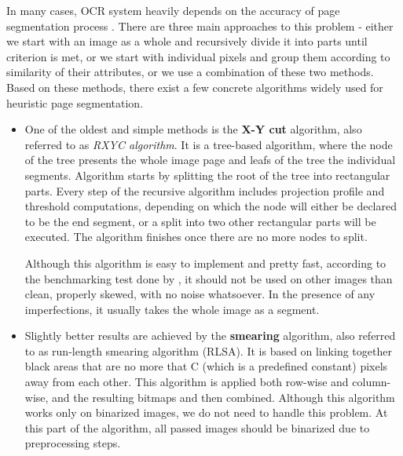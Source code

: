 In many cases, OCR system heavily depends on the accuracy of page segmentation process \citep{pageSegmentation}. There are three main approaches \citep{segmentationBenchmark} to this problem - either we start with an image as a whole and recursively divide it into parts until criterion is met, or we start with individual pixels and group them according to similarity of their attributes, or we use a combination of these two methods. Based on these methods, there exist a few concrete algorithms widely used for heuristic page segmentation.


\begin{itemize}

\item One of the oldest and simple methods is the \textbf{X-Y cut } algorithm, also referred to as \emph{RXYC algorithm}. It is a tree-based algorithm, where the node of the tree presents the whole image page and leafs of the tree the individual segments. Algorithm starts by splitting the root of the tree into rectangular parts. Every step of the recursive algorithm includes projection profile and threshold computations, depending on which the node will either be declared to be the end segment, or a split into two other rectangular parts will be executed. The algorithm finishes once there are no more nodes to split.

Although this algorithm is easy to implement and pretty fast, according to the benchmarking test done by \citet{segmentationBenchmark}, it should not be used on other images than clean, properly skewed, with no noise whatsoever. In the presence of any imperfections, it usually takes the whole image as a segment.

\item Slightly better results are achieved by the \textbf{smearing }algorithm, also referred to as run-length smearing algorithm (RLSA). It is based on linking together black areas that are no more that C (which is a predefined constant) pixels away from each other. This algorithm is applied both row-wise and column-wise, and the resulting bitmaps and then combined. Although this algorithm works only on binarized images, we do not need to handle this problem. At this part of the algorithm, all passed images should be binarized due to preprocessing steps.


\end{itemize}
